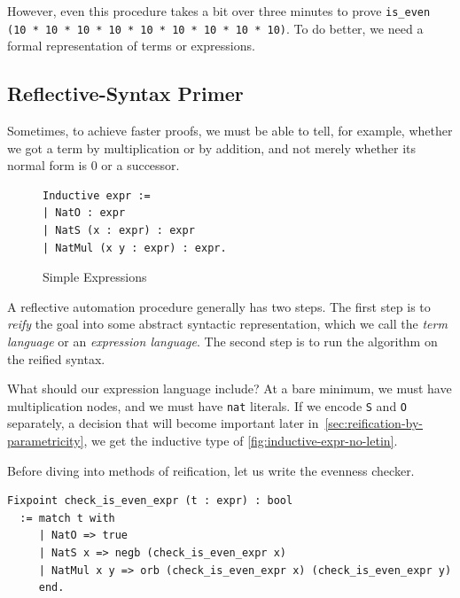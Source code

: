 However, even this procedure takes a bit over three minutes to prove \texttt{is\_even (10 * 10 * 10 * 10 * 10 * 10 * 10 * 10 * 10)}.
To do better, we need a formal representation of terms or expressions.

\subsection{Reflective-Syntax Primer}
Sometimes, to achieve faster proofs, we must be able to tell, for example, whether we got a term by multiplication or by addition, and not merely whether its normal form is 0 or a successor.%

\begin{figure}
\vspace{-45pt}
\begin{verbatim}
Inductive expr :=
| NatO : expr
| NatS (x : expr) : expr
| NatMul (x y : expr) : expr.
\end{verbatim}
\vspace{-15pt}
\caption{Simple Expressions}\label{fig:inductive-expr-no-letin}
\end{figure}

A reflective automation procedure generally has two steps.
The first step is to \emph{reify} the goal into some abstract syntactic representation, which we call the \emph{term language} or an \emph{expression language}.
The second step is to run the algorithm on the reified syntax.

What should our expression language include?
At a bare minimum, we must have multiplication nodes, and we must have \texttt{nat} literals.
If we encode \texttt{S} and \texttt{O} separately, a decision that will become important later in~\autoref{sec:reification-by-parametricity}, we get the inductive type of \autoref{fig:inductive-expr-no-letin}.

Before diving into methods of reification, let us write the evenness checker.
\begin{verbatim}
Fixpoint check_is_even_expr (t : expr) : bool
  := match t with
     | NatO => true
     | NatS x => negb (check_is_even_expr x)
     | NatMul x y => orb (check_is_even_expr x) (check_is_even_expr y)
     end.
\end{verbatim}

